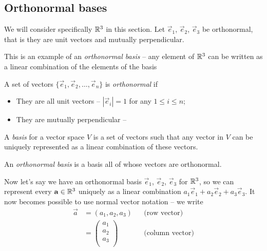 \documentclass{../../template/note}
\begin{document}
    \subsection{Orthonormal bases}

    We will consider specifically \(\mathbb R^3\) in this section. Let \(\vec e_1\), \(\vec e_2\), \(\vec e_3\) be orthonormal, that is they are unit vectors and mutually perpendicular.

    This is an example of an \emph{orthonormal basis} -- any element of \(\mathbb R^3\) can be written as a linear combination of the elements of the basis

    \begin{definition}
        A set of vectors \(\{\vec e_1, \vec e_2, \dots, \vec e_n\}\) is \emph{orthonormal} if
        \begin{itemize}
            \item They are all unit vectors -- \(|\vec e_i| = 1\) for any \(1 \leq i \leq n\);
            \item They are mutually perpendicular --
            
            
        \end{itemize}
        
        
    \end{definition}
    
    \begin{definition}
        A \emph{basis} for a vector space \(V\) is a set of vectors such that any vector in \(V\) can be uniquely represented as a linear combination of these vectors.
    \end{definition}

    \begin{definition}
        An \emph{orthonormal basis} is a basis all of whose vectors are orthonormal.
    \end{definition}
    
    Now let's say we have an orthonormal basis \(\vec e_1\), \(\vec e_2\), \(\vec e_3\) for \(\mathbb R^3\), so we can represent every \(\vec a \in \RR^3\) uniquely as a linear combination \(a_1 \vec e_1 + a_2 \vec e_2 + a_3 \vec e_3\). It now becomes possible to use normal vector notation -- we write
    \begin{align*}
        \vec a &= (a_1, a_2, a_3) && \text{(row vector)} \\
        &= \begin{pmatrix}
         a_1 \\
         a_2 \\
         a_3 \\
        \end{pmatrix} && \text{(column vector)}
    \end{align*}
    
\end{document}
